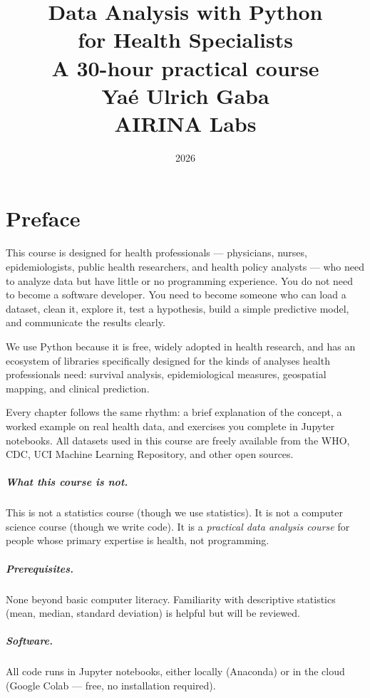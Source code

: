 \documentclass[12pt,a4paper,twoside]{book}
\title{
  \vspace{-2cm}
  {\Huge\bfseries Data Analysis with Python}\\[6pt]
  {\LARGE for Health Specialists}\\[12pt]
  {\large A 30-hour practical course}\\[24pt]
  {\normalsize Yaé Ulrich Gaba}\\[4pt]
  {\small AIRINA Labs}
}
\date{2026}
\author{}
\begin{document}
\frontmatter
\maketitle

\tableofcontents
\newpage

\chapter*{Preface}

This course is designed for health professionals --- physicians, nurses, epidemiologists, public health researchers, and health policy analysts --- who need to analyze data but have little or no programming experience. You do not need to become a software developer. You need to become someone who can load a dataset, clean it, explore it, test a hypothesis, build a simple predictive model, and communicate the results clearly.

We use Python because it is free, widely adopted in health research, and has an ecosystem of libraries specifically designed for the kinds of analyses health professionals need: survival analysis, epidemiological measures, geospatial mapping, and clinical prediction.

Every chapter follows the same rhythm: a brief explanation of the concept, a worked example on real health data, and exercises you complete in Jupyter notebooks. All datasets used in this course are freely available from the WHO, CDC, UCI Machine Learning Repository, and other open sources.

\paragraph{What this course is not.} This is not a statistics course (though we use statistics). It is not a computer science course (though we write code). It is a \emph{practical data analysis course} for people whose primary expertise is health, not programming.

\paragraph{Prerequisites.} None beyond basic computer literacy. Familiarity with descriptive statistics (mean, median, standard deviation) is helpful but will be reviewed.

\paragraph{Software.} All code runs in Jupyter notebooks, either locally (Anaconda) or in the cloud (Google Colab --- free, no installation required).
\end{document}
